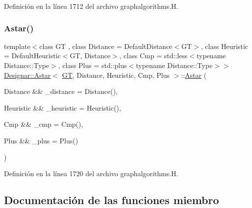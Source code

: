 Definición en la línea 1712 del archivo graphalgorithms.\+H.

\mbox{\label{class_designar_1_1_astar_a5db848d589e8e4ce7582acc061cb8b17}} 
\subsubsection{\texorpdfstring{Astar()}{Astar()}\hspace{0.1cm}{\footnotesize\ttfamily [2/2]}}
{\footnotesize\ttfamily template$<$class GT , class Distance  = Default\+Distance$<$\+G\+T$>$, class Heuristic  = Default\+Heuristic$<$\+G\+T, Distance$>$, class Cmp  = std\+::less$<$typename Distance\+::\+Type$>$, class Plus  = std\+::plus$<$typename Distance\+::\+Type$>$$>$ \\
\hyperlink{class_designar_1_1_astar}{Designar\+::\+Astar}$<$ \hyperlink{demo-buildgraph_8_c_a3001c40d2c31ca87ed96cd7d1334a55e}{GT}, Distance, Heuristic, Cmp, Plus $>$\+::\hyperlink{class_designar_1_1_astar}{Astar} (\begin{DoxyParamCaption}\item[{Distance \&\&}]{\+\_\+distance = {\ttfamily Distance()},  }\item[{Heuristic \&\&}]{\+\_\+heuristic = {\ttfamily Heuristic()},  }\item[{Cmp \&\&}]{\+\_\+cmp = {\ttfamily Cmp()},  }\item[{Plus \&\&}]{\+\_\+plus = {\ttfamily Plus()} }\end{DoxyParamCaption})\hspace{0.3cm}{\ttfamily [inline]}}



Definición en la línea 1720 del archivo graphalgorithms.\+H.



\subsection{Documentación de las funciones miembro}
\mbox{\label{class_designar_1_1_astar_ab6cf1a92f64a96290880a1483eac396f}} 
